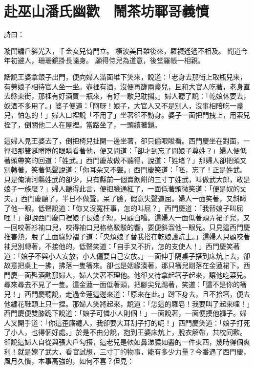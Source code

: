 %

\chapter{赴巫山潘氏幽歡　鬧茶坊鄆哥義憤}

\begin{showcontents}{}


詩曰：

璇閨繡戶斜光入，千金女兒倚門立。
橫波美目雖後來，羅襪遙遙不相及。
聞道今年初避人，珊珊鏡掛長隨身。
願得侍兒為道意，後堂羅帳一相親。

話說王婆拿銀子出門，便向婦人滿面堆下笑來，說道：「老身去那街上取瓶兒來，有勞娘子相待官人坐一坐。壺裡有酒，沒便再篩兩盞兒，且和大官人吃著，老身直去縣東街，那裡有好酒買一瓶來，有好一歇兒耽擱。」婦人聽了說：「乾娘休要去，奴酒不多用了。」婆子便道：「阿呀！娘子，大官人又不是別人，沒事相陪吃一盞兒，怕怎的！」婦人口裡說「不用了」坐著卻不動身。婆子一面把門拽上，用索兒拴了，倒關他二人在屋裡。當路坐了，一頭續著鎖。

這婦人見王婆去了，倒把椅兒扯開一邊坐著，卻只偷眼睃看。西門慶坐在對面，一徑把那雙涎瞪瞪的眼睛看著他，便又問道：「卻才到忘了問娘子尊姓？」婦人便低著頭帶笑的回道：「姓武。」西門慶故做不聽得，說道：「姓堵？」那婦人卻把頭又別轉著，笑著低聲說道：「你耳朵又不聾。」西門慶笑道：「呸，忘了！正是姓武。只是俺清河縣姓武的卻少，只有縣前一個賣飲餅的三寸丁姓武，叫做武大郎，敢是娘子一族麼？」婦人聽得此言，便把臉通紅了，一面低著頭微笑道：「便是奴的丈夫。」西門慶聽了，半日不做聲，呆了臉，假意失聲道屈。婦人一面笑著，又斜瞅了他一眼，低聲說道：「你又沒冤枉事，怎的叫屈？」西門慶道：「我替娘子叫屈哩！」卻說西門慶口裡娘子長娘子短，只顧白嘈。這婦人一面低著頭弄裙子兒，又一回咬著衫袖口兒，咬得袖口兒格格駁駁的響，要便斜溜他一眼兒。只見這西門慶推害熱，脫了上面綠紗褶子道：「央煩娘子替我搭在乾娘護炕上。」這婦人只顧咬著袖兒別轉著，不接他的，低聲笑道：「自手又不折，怎的支使人！」西門慶笑著道：「娘子不與小人安放，小人偏要自己安放。」一面伸手隔桌子搭到床炕上去，卻故意把桌上一拂，拂落一隻箸來。卻也是姻緣湊著，那只箸兒剛落在金蓮裙下。西門慶一面斟酒勸那婦人，婦人笑著不理他。他卻又待拿起箸子起來，讓他吃菜兒。尋來尋去不見了一隻。這金蓮一面低著頭，把腳尖兒踢著，笑道：「這不是你的箸兒！」西門慶聽說，走過金蓮這邊來道：「原來在此。」蹲下身去，且不拾箸，便去他繡花鞋頭上只一捏。那婦人笑將起來，說道：「怎這的羅皂！我要叫了起來哩！」西門慶便雙膝跪下說道：「娘子可憐小人則個！」一面說著，一面便摸他褲子。婦人叉開手道：「你這歪廝纏人，我卻要大耳刮子打的呢！」西門慶笑道：「娘子打死了小人，也得個好處。」於是不由分說，抱到王婆床炕上，脫衣解帶，共枕同歡。卻說這婦人自從與張大戶勾搭，這老兒是軟如鼻涕膿如醬的一件東西，幾時得個爽利！就是嫁了武大，看官試想，三寸丁的物事，能有多少力量？今番遇了西門慶，風月久慣，本事高強的，如何不喜？但見：


\end{showcontents}
